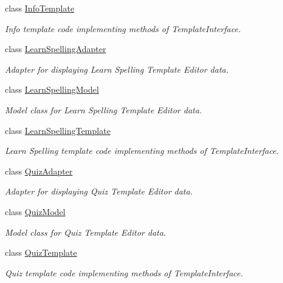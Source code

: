 \begin{DoxyCompactItemize}
class \hyperlink{classorg_1_1buildmlearn_1_1toolkit_1_1templates_1_1InfoTemplate}{Info\-Template}
\begin{DoxyCompactList}\small\item\em Info template code implementing methods of Template\-Interface. \end{DoxyCompactList}\item 
class \hyperlink{classorg_1_1buildmlearn_1_1toolkit_1_1templates_1_1LearnSpellingAdapter}{Learn\-Spelling\-Adapter}
\begin{DoxyCompactList}\small\item\em Adapter for displaying Learn Spelling Template Editor data. \end{DoxyCompactList}\item 
class \hyperlink{classorg_1_1buildmlearn_1_1toolkit_1_1templates_1_1LearnSpellingModel}{Learn\-Spelling\-Model}
\begin{DoxyCompactList}\small\item\em Model class for Learn Spelling Template Editor data. \end{DoxyCompactList}\item 
class \hyperlink{classorg_1_1buildmlearn_1_1toolkit_1_1templates_1_1LearnSpellingTemplate}{Learn\-Spelling\-Template}
\begin{DoxyCompactList}\small\item\em Learn Spelling template code implementing methods of Template\-Interface. \end{DoxyCompactList}\item 
class \hyperlink{classorg_1_1buildmlearn_1_1toolkit_1_1templates_1_1QuizAdapter}{Quiz\-Adapter}
\begin{DoxyCompactList}\small\item\em Adapter for displaying Quiz Template Editor data. \end{DoxyCompactList}\item 
class \hyperlink{classorg_1_1buildmlearn_1_1toolkit_1_1templates_1_1QuizModel}{Quiz\-Model}
\begin{DoxyCompactList}\small\item\em Model class for Quiz Template Editor data. \end{DoxyCompactList}\item 
class \hyperlink{classorg_1_1buildmlearn_1_1toolkit_1_1templates_1_1QuizTemplate}{Quiz\-Template}
\begin{DoxyCompactList}\small\item\em Quiz template code implementing methods of Template\-Interface. \end{DoxyCompactList}\end{DoxyCompactItemize}
